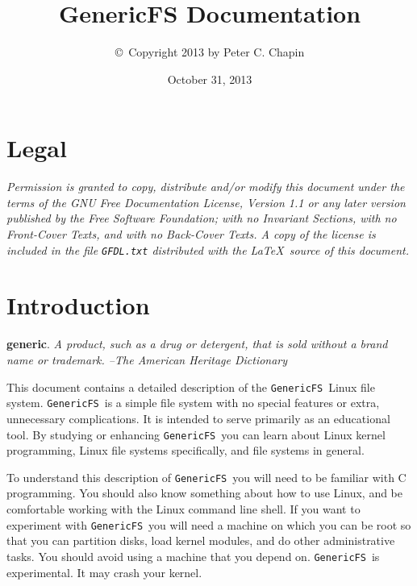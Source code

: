 \documentclass[twocolumn]{article}
\newcommand{\GenericFS}{\texttt{GenericFS}}
\begin{document}
\lstset{language=C,
        stringstyle=\ttfamily,
        showstringspaces=false}

\title{GenericFS Documentation}
\author{\copyright\ Copyright 2013 by Peter C. Chapin}
\date{October 31, 2013}
\maketitle

\tableofcontents

\section*{Legal}
\label{sec:legal}

\textit{Permission is granted to copy, distribute and/or modify this document under the terms of
the GNU Free Documentation License, Version 1.1 or any later version published by the Free
Software Foundation; with no Invariant Sections, with no Front-Cover Texts, and with no
Back-Cover Texts. A copy of the license is included in the file \texttt{GFDL.txt} distributed
with the \LaTeX\ source of this document.}

\section{Introduction}
\label{sec:intro}

\textbf{generic}. \textit{A product, such as a drug or detergent, that is sold without a brand
name or trademark. --The American Heritage Dictionary}

This document contains a detailed description of the \GenericFS\ Linux file system. \GenericFS\
is a simple file system with no special features or extra, unnecessary complications. It is
intended to serve primarily as an educational tool. By studying or enhancing \GenericFS\ you can
learn about Linux kernel programming, Linux file systems specifically, and file systems in
general.

To understand this description of \GenericFS\ you will need to be familiar with C programming.
You should also know something about how to use Linux, and be comfortable working with the Linux
command line shell. If you want to experiment with \GenericFS\ you will need a machine on which
you can be root so that you can partition disks, load kernel modules, and do other
administrative tasks. You should avoid using a machine that you depend on. \GenericFS\ is
experimental. It may crash your kernel.







\end{document}
